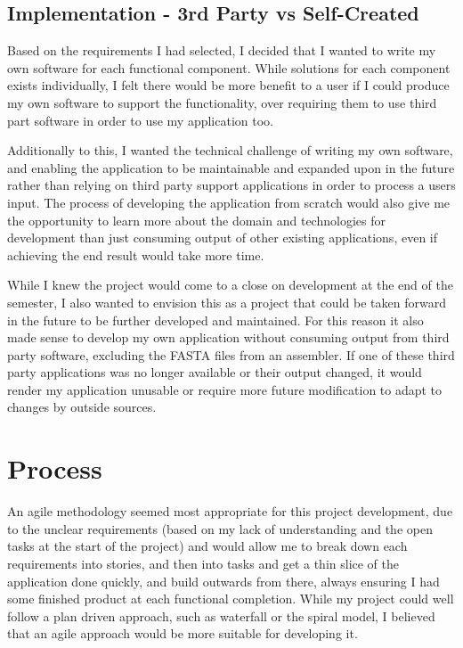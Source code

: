 \subsection{Implementation - 3rd Party vs Self-Created}
Based on the requirements I had selected, I decided that I wanted to write my own software for each functional component. While solutions for each component exists individually, I felt there would be more benefit to a user if I could produce my own software to support the functionality, over requiring them to use third part software in order to use my application too.

Additionally to this, I wanted the technical challenge of writing my own software, and enabling the application to be maintainable and expanded upon in the future rather than relying on third party support applications in order to process a users input. The process of developing the application from scratch would also give me the opportunity to learn more about the domain and technologies for development than just consuming output of other existing applications, even if achieving the end result would take more time.

While I knew the project would come to a close on development at the end of the semester, I also wanted to envision this as a project that could be taken forward in the future to be further developed and maintained. For this reason it also made sense to develop my own application without consuming output from third party software, excluding the FASTA files from an assembler. If one of these third party applications was no longer available or their output changed, it would render my application unusable or require more future modification to adapt to changes by outside sources.


\section{Process}
An agile methodology seemed most appropriate for this project development, due to the unclear requirements (based on my lack of understanding and the open tasks at the start of the project) and would allow me to break down each requirements into stories, and then into tasks and get a thin slice of the application done quickly, and build outwards from there, always ensuring I had some finished product at each functional completion. While my project could well follow a plan driven approach, such as waterfall or the spiral model, I believed that an agile approach would be more suitable for developing it. 

